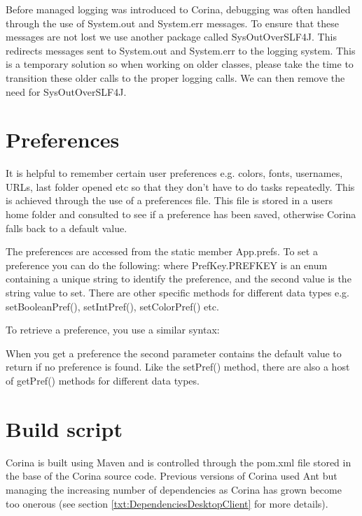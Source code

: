 Before managed logging was introduced to Corina, debugging was often handled through the use of System.out and System.err messages.  To ensure that these messages are not lost we use another package called SysOutOverSLF4J.  This redirects messages sent to System.out and System.err to the logging system.  This is a temporary solution so when working on older classes, please take the time to transition these older calls to the proper logging calls.  We can then remove the need for SysOutOverSLF4J.


\section{Preferences}
It is helpful to remember certain user preferences e.g. colors, fonts, usernames, URLs, last folder opened etc so that they don't have to do tasks repeatedly.  This is achieved through the use of a preferences file.  This file is stored in a users home folder and consulted to see if a preference has been saved, otherwise Corina falls back to a default value.  

The preferences are accessed from the static member App.prefs.  To set a preference you can do the following:
where PrefKey.PREFKEY is an enum containing a unique string to identify the preference, and the second value is the string value to set.  There are other specific methods for different data types e.g. setBooleanPref(), setIntPref(), setColorPref() etc.

To retrieve a preference, you use a similar syntax:

When you get a preference the second parameter contains the default value to return if no preference is found.  Like the setPref() method, there are also a host of getPref() methods for different data types.



\section{Build script}
\label{txt:buildScript}
Corina is built using Maven and is controlled through the pom.xml file stored in the base of the Corina source code.  Previous versions of Corina used Ant but managing the increasing number of dependencies as Corina has grown become too onerous (see section \ref{txt:DependenciesDesktopClient} for more details). 

